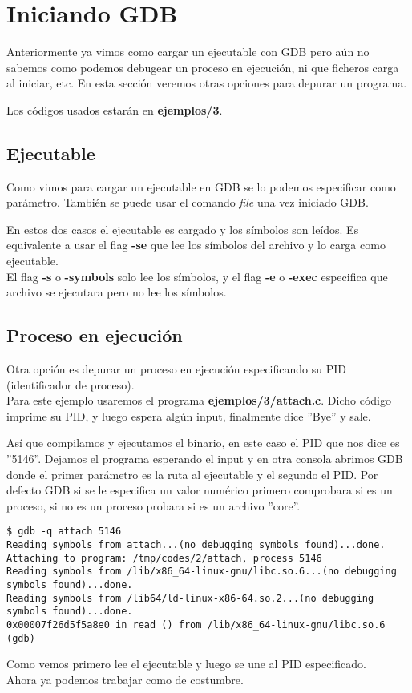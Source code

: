 \section{Iniciando GDB}
Anteriormente ya vimos como cargar un ejecutable con GDB pero aún no sabemos como podemos debugear un proceso en ejecución, ni que ficheros carga al iniciar, etc. En esta sección veremos otras opciones para depurar un programa.

Los códigos usados estarán en \textbf{ejemplos/3}.

\subsection{Ejecutable}
Como vimos para cargar un ejecutable en GDB se lo podemos especificar como parámetro. También se puede usar el comando \emph{file} una vez iniciado GDB. 

En estos dos casos el ejecutable es cargado y los símbolos son leídos. Es equivalente a usar el flag \textbf{-se} que lee los símbolos del archivo y lo carga como ejecutable.\\
El flag \textbf{-s} o \textbf{-symbols} solo lee los símbolos, y el flag \textbf{-e} o \textbf{-exec} especifica que archivo se ejecutara pero no lee los símbolos.


\subsection{Proceso en ejecución}
Otra opción es depurar un proceso en ejecución especificando su PID (identificador de proceso). \\
Para este ejemplo usaremos el programa \textbf{ejemplos/3/attach.c}. Dicho código imprime su PID, y luego espera algún input, finalmente dice ''Bye'' y sale.

Así que compilamos y ejecutamos el binario, en este caso el PID que nos dice es ''5146''.
Dejamos el programa esperando el input y en otra consola abrimos GDB donde el primer parámetro es la ruta al ejecutable y el segundo el PID. Por defecto GDB si se le especifica un valor numérico primero comprobara si es un proceso, si no es un proceso probara si es un archivo ''core''.
\begin{verbatim}
$ gdb -q attach 5146
Reading symbols from attach...(no debugging symbols found)...done.
Attaching to program: /tmp/codes/2/attach, process 5146
Reading symbols from /lib/x86_64-linux-gnu/libc.so.6...(no debugging symbols found)...done.
Reading symbols from /lib64/ld-linux-x86-64.so.2...(no debugging symbols found)...done.
0x00007f26d5f5a8e0 in read () from /lib/x86_64-linux-gnu/libc.so.6
(gdb) 
\end{verbatim}
Como vemos primero lee el ejecutable y luego se une al PID especificado.\\
Ahora ya podemos trabajar como de costumbre. \\

